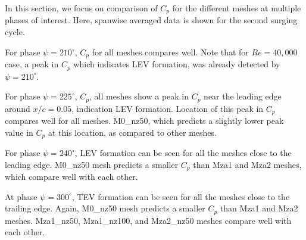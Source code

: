 
In this section, we focus on comparison of $C_p$ for the different meshes at multiple phases of interest.
Here, spanwise averaged data is shown for the second surging cycle.

For phase $\psi=210^\circ$, $C_p$ for all meshes compares well. Note that for $Re=40,000$ case, a peak in $C_p$ which indicates LEV formation, was already detected by $\psi=210^\circ$. 

For phase $\psi=225^\circ$, $C_p$, all meshes show a peak in $C_p$ near the leading edge around $x/c = 0.05$, indication LEV formation.
Location of this peak in $C_p$ compares well for all meshes.
M0\_nz50, which predicts a slightly lower peak value in $C_p$ at this location, as compared to other meshes.

For phase $\psi=240^\circ$, LEV formation can be seen for all the meshes close to the leading edge.
M0\_nz50 mesh predicts a smaller $C_p$ than Mza1 and Mza2 meshes, which compare well with each other.

At phase $\psi=300^\circ$, TEV formation can be seen for all the meshes close to the trailing edge.
Again, M0\_nz50 mesh predicts a smaller $C_p$ than Mza1 and Mza2 meshes.
Mza1\_nz50, Mza1\_nz100, and Mza2\_nz50 meshes compare well with each other.


